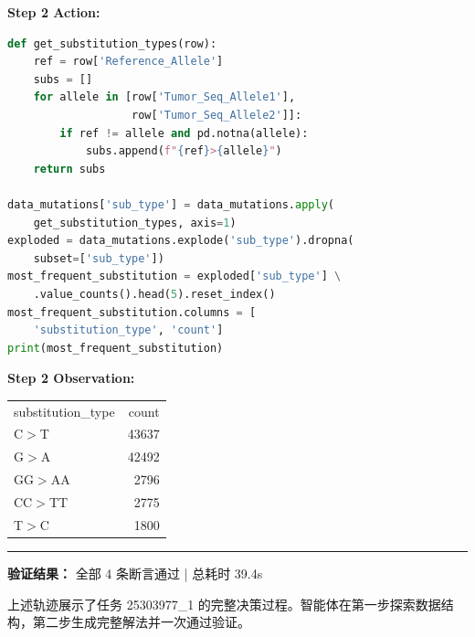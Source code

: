 \begin{mdframed}[linewidth=0.8pt, roundcorner=5pt, backgroundcolor=gray!5,
  innertopmargin=8pt, innerbottommargin=8pt,
  skipabove=10pt, skipbelow=10pt]
\vspace{4pt}
\textbf{Step 2 \quad Action:}
\begin{lstlisting}[language=Python, basicstyle=\scriptsize\ttfamily,
  numbers=none, xleftmargin=4pt, framexleftmargin=0pt,
  breaklines=true, breakatwhitespace=true, frame=none,
  backgroundcolor={}]
def get_substitution_types(row):
    ref = row['Reference_Allele']
    subs = []
    for allele in [row['Tumor_Seq_Allele1'],
                   row['Tumor_Seq_Allele2']]:
        if ref != allele and pd.notna(allele):
            subs.append(f"{ref}>{allele}")
    return subs

data_mutations['sub_type'] = data_mutations.apply(
    get_substitution_types, axis=1)
exploded = data_mutations.explode('sub_type').dropna(
    subset=['sub_type'])
most_frequent_substitution = exploded['sub_type'] \
    .value_counts().head(5).reset_index()
most_frequent_substitution.columns = [
    'substitution_type', 'count']
print(most_frequent_substitution)
\end{lstlisting}

\vspace{2pt}
\textbf{Step 2 \quad Observation:}

{\small\ttfamily
\begin{tabular}{lr}
substitution\_type & count \\
C$>$T & 43637 \\
G$>$A & 42492 \\
GG$>$AA & 2796 \\
CC$>$TT & 2775 \\
T$>$C & 1800 \\
\end{tabular}
}

\vspace{4pt}
\hrule
\vspace{6pt}

\textbf{验证结果：} \checkmark{} 全部 4 条断言通过 \quad | \quad 总耗时 39.4s

\end{mdframed}

\noindent 上述轨迹展示了任务 25303977\_1 的完整决策过程。智能体在第一步探索数据结构，第二步生成完整解法并一次通过验证。
